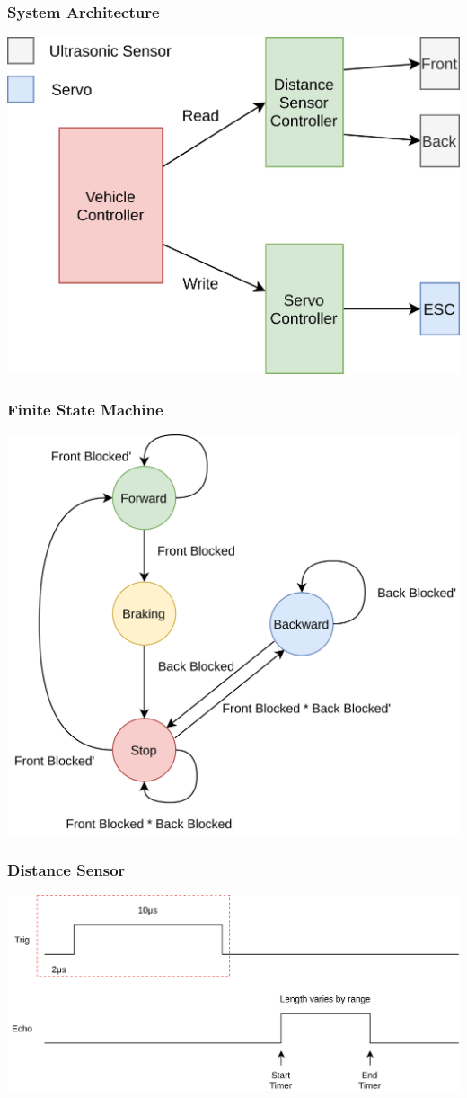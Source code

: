 \documentclass{beamer}
\begin{document}
\begin{frame}
    \frametitle{System Architecture}
    \centering
    \includegraphics[scale=0.065]{img/system-architecture.png}
\end{frame}

\begin{frame}
    \frametitle{Finite State Machine}
    \centering
    \includegraphics[scale=0.06, keepaspectratio]{img/finite-state-machine.png}
\end{frame}

\begin{frame}
    \frametitle{Distance Sensor}
    \includegraphics[width=\linewidth]{img/ultrasonic-sensor.png}
\end{frame}
\end{document}
